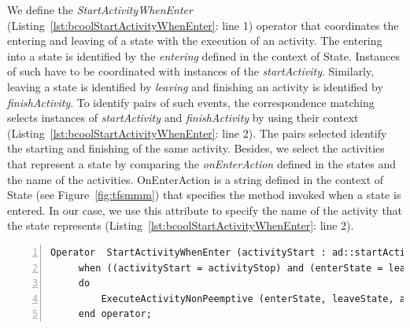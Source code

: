 	
We define the \emph{StartActivityWhenEnter} (Listing~\ref{lst:bcoolStartActivityWhenEnter}: line 1) operator that coordinates the entering and leaving of a state with the execution of an activity. The entering into a state is identified by the \dse \textit{entering} defined in the context of State. Instances of such \dse have to be coordinated with instances of the \dse \textit{startActivity}. Similarly, leaving a state is identified by \dse \textit{leaving} and finishing an activity is identified by \dse \textit{finishActivity}. To identify pairs of such events, the correspondence matching selects instances of \dse \emph{startActivity} and \emph{finishActivity} by using their context (Listing~\ref{lst:bcoolStartActivityWhenEnter}: line 2). The pairs selected identify the starting and finishing of the same activity. Besides, we select the activities that represent a state by comparing the \emph{onEnterAction} defined in the states and the name of the activities. OnEnterAction is a string defined in the context of State (see Figure~\ref{fig:tfsmmm}) that specifies the method invoked when a state is entered. In our case, we use this attribute to specify the name of the activity that the state represents (Listing~\ref{lst:bcoolStartActivityWhenEnter}: line 2).
	
	 
	 \begin{lstlisting}[language=bcool,
	 caption={\bcool specification of the \emph{StartActivityWhenEnter} operator},
	 label={lst:bcoolStartActivityWhenEnter}, 
	 basicstyle=\scriptsize\ttfamily, backgroundcolor=\color{LGrey}, numbers=left, xleftmargin=2pt]
	 Operator  StartActivityWhenEnter (activityStart : ad::startActivity , activityStop : ad::finishActivity, enterState : tfsm::entering, leaveState : tfsm::leaving)
	 when ((activityStart = activityStop) and (enterState = leaveState) and (activityStart.name = enterState.onEnterAction));
	 do 
		 ExecuteActivityNonPeemptive (enterState, leaveState, activityStart, activityStop)
	 end operator;
	 \end{lstlisting}
	 
